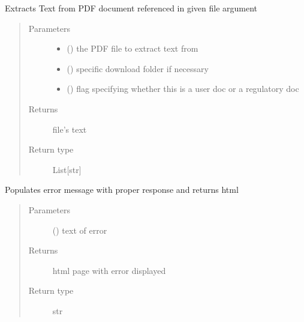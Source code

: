 \documentclass[letterpaper,10pt,english]{sphinxmanual}
\begin{document}

\begin{fulllineitems}
\label{\detokenize{functionsv1:common_functions.extractpdftext}}
Extracts Text from PDF document referenced in given file argument
\begin{quote}\begin{description}
\item[{Parameters}] \leavevmode\begin{itemize}
\item {} 
 () \textendash{} the PDF file to extract text from

\item {} 
 () \textendash{} specific download folder if necessary

\item {} 
 () \textendash{} flag specifying whether this is a user doc or a regulatory doc

\end{itemize}

\item[{Returns}] \leavevmode
file’s text

\item[{Return type}] \leavevmode
List{[}str{]}

\end{description}\end{quote}

\end{fulllineitems}


\begin{fulllineitems}
\label{\detokenize{functionsv1:common_functions.geterrorpage}}
Populates error message with proper response and returns html
\begin{quote}\begin{description}
\item[{Parameters}] \leavevmode
{} () \textendash{} text of error

\item[{Returns}] \leavevmode
html page with error displayed

\item[{Return type}] \leavevmode
str

\end{description}\end{quote}

\end{fulllineitems}
\end{document}
